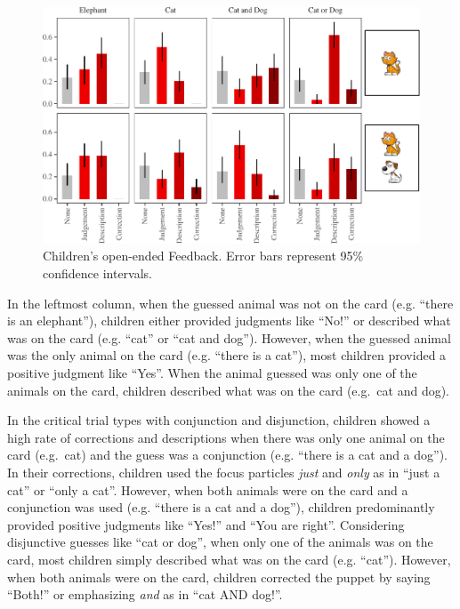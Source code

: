 \documentclass[floatsintext,man]{apa6}
\theoremstyle{definition}
\theoremstyle{definition}
\theoremstyle{definition}
\theoremstyle{remark}
\begin{document}
\begin{figure}
\centering
\includegraphics{figs/feedbackData-1.pdf}
\caption{\label{fig:feedbackData}Children's open-ended Feedback. Error bars
represent 95\% confidence intervals.}
\end{figure}

In the leftmost column, when the guessed animal was not on the card
(e.g. \enquote{there is an elephant}), children either provided
judgments like \enquote{No!} or described what was on the card (e.g.
\enquote{cat} or \enquote{cat and dog}). However, when the guessed
animal was the only animal on the card (e.g. \enquote{there is a cat}),
most children provided a positive judgment like \enquote{Yes}. When the
animal guessed was only one of the animals on the card, children
described what was on the card (e.g.~cat and dog).

In the critical trial types with conjunction and disjunction, children
showed a high rate of corrections and descriptions when there was only
one animal on the card (e.g.~cat) and the guess was a conjunction (e.g.
\enquote{there is a cat and a dog}). In their corrections, children used
the focus particles \emph{just} and \emph{only} as in \enquote{just a
cat} or \enquote{only a cat}. However, when both animals were on the
card and a conjunction was used (e.g. \enquote{there is a cat and a
dog}), children predominantly provided positive judgments like
\enquote{Yes!} and \enquote{You are right}. Considering disjunctive
guesses like \enquote{cat or dog}, when only one of the animals was on
the card, most children simply described what was on the card (e.g.
\enquote{cat}). However, when both animals were on the card, children
corrected the puppet by saying \enquote{Both!} or emphasizing \emph{and}
as in \enquote{cat AND dog!}.
\end{document}
